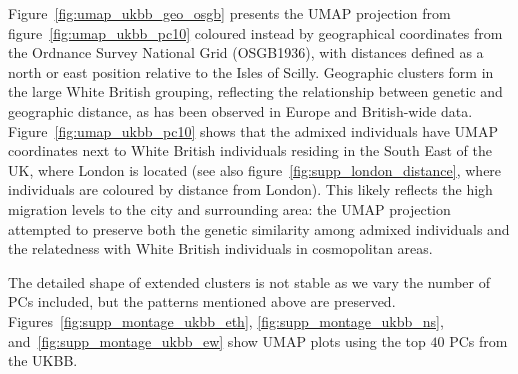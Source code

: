 \documentclass[12pt]{pnas-new}
\begin{document}
Figure~\ref{fig:umap_ukbb_geo_osgb} presents the UMAP projection from figure~\ref{fig:umap_ukbb_pc10} coloured instead by geographical coordinates from the Ordnance Survey National Grid (OSGB1936), with distances defined as a north or east position relative to the Isles of Scilly. Geographic clusters form in the large White British grouping, reflecting the relationship between genetic and geographic distance, as has been observed in Europe and British-wide data\cite{novembre2008europe,leslie2015fine}. Figure~\ref{fig:umap_ukbb_pc10} shows that the admixed individuals have UMAP coordinates next to White British individuals residing in the South East of the UK, where London is located (see also figure~\ref{fig:supp_london_distance}, where individuals are coloured by distance from London). This likely reflects the high migration levels to the city and surrounding area: the UMAP projection attempted to preserve both the genetic similarity among admixed individuals and the relatedness with White British individuals in cosmopolitan areas. 

 The detailed shape of extended clusters is not stable as we vary the number of PCs included, but the patterns mentioned above are preserved. Figures~\ref{fig:supp_montage_ukbb_eth}, \ref{fig:supp_montage_ukbb_ns}, and~\ref{fig:supp_montage_ukbb_ew} show UMAP plots using the top $40$ PCs from the UKBB.
\end{document}
